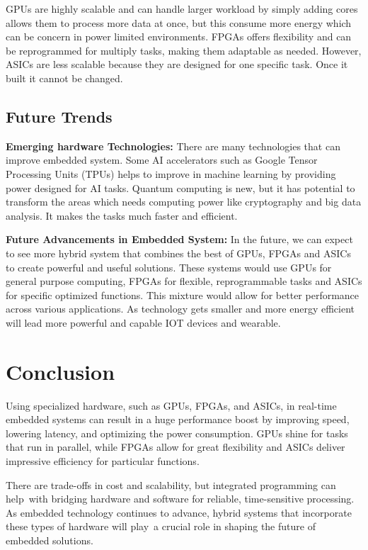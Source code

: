 \documentclass{article}
\begin{document}
GPUs are highly scalable and can handle larger workload by simply adding cores allows them to process more data at once, but this consume more energy which can be concern in power limited environments. FPGAs offers flexibility and can be reprogrammed for multiply tasks, making them adaptable as needed. However, ASICs are less scalable because they are designed for one specific task. Once it built it cannot be changed.

\subsection{Future Trends}
\textbf{Emerging hardware Technologies:}
There are many technologies that can improve embedded system. Some AI accelerators such as Google Tensor Processing Units (TPUs) helps to improve in machine learning by providing power designed for AI tasks. Quantum computing is new, but it has potential to transform the areas which needs computing power like cryptography and big data analysis. It makes the tasks much faster and efficient.

\textbf{Future Advancements in Embedded System:}
In the future, we can expect to see more hybrid system that combines the best of GPUs, FPGAs and ASICs to create powerful and useful solutions. These systems would use GPUs for general purpose computing, FPGAs for flexible, reprogrammable tasks and ASICs for specific optimized functions. This mixture would allow for better performance across various applications. As technology gets smaller and more energy efficient will lead more powerful and capable IOT devices and wearable.

\newpage
\section{Conclusion}
Using specialized hardware, such as GPUs, FPGAs, and ASICs, in real-time embedded systems can result in a huge performance boost by improving speed, lowering latency, and optimizing the power consumption. GPUs shine for tasks that run in parallel, while FPGAs allow for great flexibility and ASICs deliver impressive efficiency for particular functions.

There are trade-offs in cost and scalability, but integrated programming can help with bridging hardware and software for reliable, time-sensitive processing. As embedded technology continues to advance, hybrid systems that incorporate these types of hardware will play a crucial role in shaping the future of embedded solutions.
\end{document}
